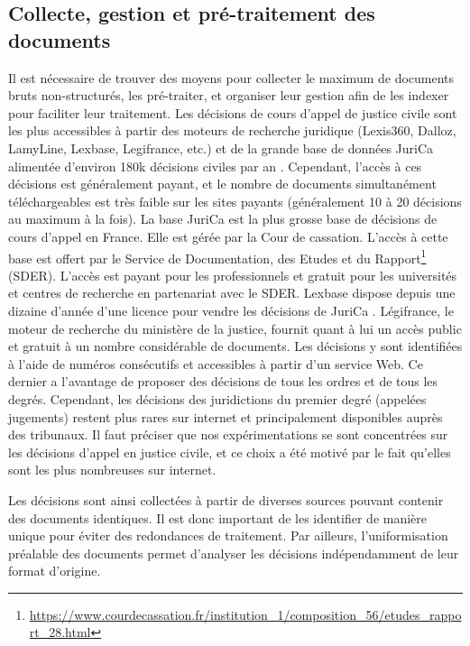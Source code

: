 \subsection{Collecte, gestion et pré-traitement des documents}
Il est nécessaire de trouver des moyens pour collecter le maximum de documents bruts non-structurés, les pré-traiter, et organiser leur gestion afin de les indexer pour faciliter leur traitement. Les décisions de cours d'appel de justice civile sont les plus accessibles à partir des moteurs de recherche juridique (Lexis360, Dalloz, LamyLine, Lexbase, Legifrance, etc.) et de la grande base de données JuriCa alimentée d'environ 180k décisions civiles par an \citep{lamanda2010}. Cependant, l'accès à ces décisions est généralement payant, et le nombre de documents simultanément téléchargeables est très faible sur les sites payants (généralement 10 à 20 décisions au maximum à la fois). La base JuriCa est la plus grosse base de décisions de cours d'appel en France. Elle est gérée par la Cour de cassation. L'accès à cette base est offert par le Service de Documentation, des Etudes et du Rapport\footnote{\url{https://www.courdecassation.fr/institution_1/composition_56/etudes_rapport_28.html}} (SDER). L'accès est payant pour les professionnels et gratuit pour les universités et centres de recherche en partenariat avec le SDER. Lexbase dispose depuis une dizaine d'année d'une licence pour vendre les décisions de JuriCa \citep{barthe2010}. Légifrance, le moteur de recherche du ministère de la justice, fournit quant à lui un accès public et gratuit à un nombre considérable de documents. Les décisions y sont identifiées à l'aide de numéros consécutifs et accessibles à partir d'un service Web. Ce dernier a l'avantage de proposer des décisions de tous les ordres et de tous les degrés. Cependant, les décisions des juridictions du premier degré (appelées jugements) restent plus rares sur internet et principalement disponibles auprès des tribunaux. Il faut préciser que nos expérimentations se sont concentrées sur les décisions d'appel en justice civile, et ce choix a été motivé par le fait qu'elles sont les plus nombreuses sur internet.

Les décisions sont ainsi collectées à partir de diverses sources pouvant contenir des documents identiques. Il est donc important de les identifier de manière unique pour éviter des redondances de traitement. Par ailleurs, l'uniformisation préalable des documents permet d'analyser les décisions indépendamment de leur format d'origine.

